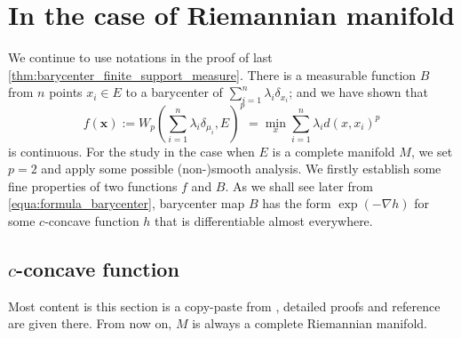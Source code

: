 \chapter{In the case of Riemannian manifold}

We continue to use notations in the proof of last \cref{thm:barycenter_finite_support_measure}.
There is a measurable function $B$ from $n$ points $x_i \in E$ to a barycenter of $\sum_{i=1}^{n} \lambda_i \delta_{x_i}$;
and we have shown that
\[f(\boldsymbol{x}) :=W_p(\sum_{i=1}^n \lambda_i \delta_{\mu_i}, E)^p =\min_x \sum_{i=1}^n \lambda_i d(x, x_i)^p\]
is continuous.
For the study in the case when $E$ is a complete manifold $M$,
we set $p = 2$ and apply some possible (non-)smooth analysis.
We firstly establish some fine properties of two functions $f$ and $B$.
As we shall see later from \cref{equa:formula_barycenter},
barycenter map $B$
has the form $\exp( - \nabla h)$ for some $c$-concave
function $h$ that is differentiable almost everywhere.
\section{\texorpdfstring{$c$}{c}-concave function}

Most content is this section is a copy-paste from \cite{cordero2001riemannian},
detailed proofs and reference are given there.
From now on, $M$ is always a complete Riemannian manifold.


